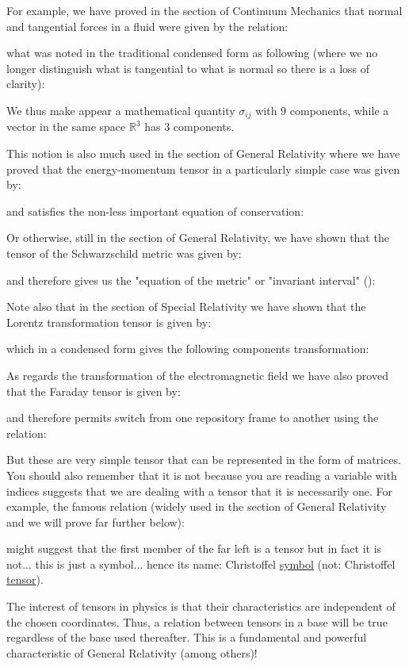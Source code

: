 	\label{tensor notation}For example, we have proved in the section of Continuum Mechanics that normal and tangential forces in a fluid were given by the relation:
	
	what was noted in the traditional condensed form as following (where we no longer distinguish what is tangential to what is normal so there is a loss of clarity):
	
	We thus make appear a mathematical quantity $\sigma_{ij}$ with $9$ components, while a vector in the same space $\mathbb{R}^3$ has $3$ components.
	
	This notion is also much used in the section of General Relativity where we have proved that the energy-momentum tensor in a particularly simple case was given by:
	
	and satisfies the non-less important equation of conservation:
	
	Or otherwise, still in the section of General Relativity, we have shown that the tensor of the Schwarzschild metric was given by:
	
	and therefore gives us the "equation of the metric" or "invariant interval" ():
	
	Note also that in the section of Special Relativity we have shown that the Lorentz transformation tensor is given by:
	
	which in a condensed form gives the following components transformation:
	
	As regards the transformation of the electromagnetic field we have also proved that the Faraday tensor is given by:
	
	and therefore permits switch from one repository frame to another using the relation:
	
	But these are very simple tensor that can be represented in the form of matrices. You should also remember that it is not because you are reading a variable with indices suggests that we are dealing with a tensor that it is necessarily one. For example, the famous relation (widely used in the section of General Relativity and we will prove far further below):
	
	might suggest that the first member of the far left is a tensor but in fact it is not... this is just a symbol... hence its name: Christoffel \underline{symbol} (not: Christoffel \underline{tensor}).
	
	The interest of tensors in physics is that their characteristics are independent of the chosen coordinates. Thus, a relation between tensors in a base will be true regardless of the base used thereafter. This is a fundamental and powerful characteristic of General Relativity (among others)!
	
